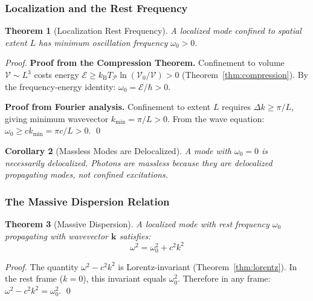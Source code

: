 \documentclass[twocolumn,10pt,a4paper]{article}
\newtheorem{theorem}{Theorem}[section]
\newtheorem{corollary}[theorem]{Corollary}
\theoremstyle{definition}
\theoremstyle{remark}
\newcommand{\kB}{k_{\mathrm{B}}}
\newcommand{\Cost}{\mathcal{E}}
\newcommand{\Partition}{\mathcal{P}}
\begin{document}
\subsubsection{Localization and the Rest Frequency}

\begin{theorem}[Localization Rest Frequency]
\label{thm:rest-freq}
A localized mode confined to spatial extent $L$ has minimum oscillation frequency $\omega_0 > 0$.
\end{theorem}

\begin{proof}
\textbf{Proof from the Compression Theorem.} Confinement to volume $\mathcal{V} \sim L^3$ costs energy $\Cost \geq \kB T_{\Partition} \ln(\mathcal{V}_0/\mathcal{V}) > 0$ (Theorem~\ref{thm:compression}). By the frequency-energy identity: $\omega_0 = \Cost/\hbar > 0$.

\textbf{Proof from Fourier analysis.} Confinement to extent $L$ requires $\Delta k \geq \pi/L$, giving minimum wavevector $k_{\min} = \pi/L > 0$. From the wave equation: $\omega_0 \geq ck_{\min} = \pi c/L > 0$. \qed
\end{proof}

\begin{corollary}[Massless Modes are Delocalized]
A mode with $\omega_0 = 0$ is necessarily delocalized. Photons are massless because they are delocalized propagating modes, not confined excitations.
\end{corollary}

\subsubsection{The Massive Dispersion Relation}

\begin{theorem}[Massive Dispersion]
\label{thm:dispersion}
A localized mode with rest frequency $\omega_0$ propagating with wavevector $\mathbf{k}$ satisfies:
\begin{equation}
    \omega^2 = \omega_0^2 + c^2k^2
    \label{eq:dispersion}
\end{equation}
\end{theorem}

\begin{proof}
The quantity $\omega^2 - c^2k^2$ is Lorentz-invariant (Theorem~\ref{thm:lorentz}). In the rest frame ($k = 0$), this invariant equals $\omega_0^2$. Therefore in any frame: $\omega^2 - c^2k^2 = \omega_0^2$. \qed
\end{proof}
\end{document}
